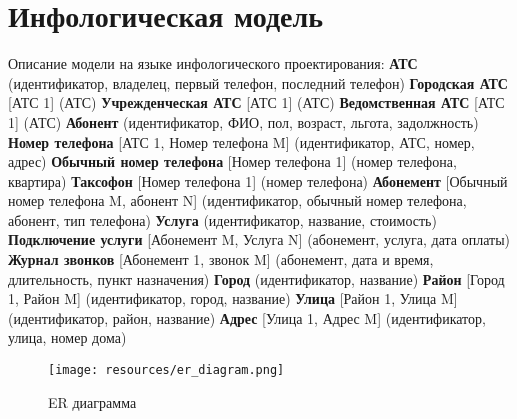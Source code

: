 \documentclass{report}
\begin{document}
\section{Инфологическая модель}
Описание модели на языке инфологического проектирования:
\newline\textbf{АТС} (идентификатор, владелец, первый телефон, последний телефон)
\newline\textbf{Городская АТС} [АТС 1] (АТС)
\newline\textbf{Учрежденческая АТС} [АТС 1] (АТС)
\newline\textbf{Ведомственная АТС} [АТС 1] (АТС)
\newline\textbf{Абонент} (идентификатор, ФИО, пол, возраст, льгота, задолжность)
\newline\textbf{Номер телефона} [АТС 1, Номер телефона M] (идентификатор, АТС, номер, адрес)
\newline\textbf{Обычный номер телефона} [Номер телефона 1] (номер телефона, квартира)
\newline\textbf{Таксофон} [Номер телефона 1] (номер телефона)
\newline\textbf{Абонемент} [Обычный номер телефона M, абонент N] (идентификатор, 
обычный номер телефона, абонент, тип телефона)
\newline\textbf{Услуга} (идентификатор, название, стоимость)
\newline\textbf{Подключение услуги} [Абонемент M, Услуга N] (абонемент, услуга, дата оплаты)
\newline\textbf{Журнал звонков} [Абонемент 1, звонок M] (абонемент, дата и время, 
длительность, пункт назначения)
\newline\textbf{Город} (идентификатор, название)
\newline\textbf{Район} [Город 1, Район M] (идентификатор, город, название)
\newline\textbf{Улица} [Район 1, Улица M] (идентификатор, район, название)
\newline\textbf{Адрес} [Улица 1, Адрес M] (идентификатор, улица, номер дома)

\begin{figure}[!ht]
\begin{center}
\texttt{[image: resources/er\_diagram.png]}\caption{ER диаграмма}
\end{center}
\end{figure}
\end{document}
